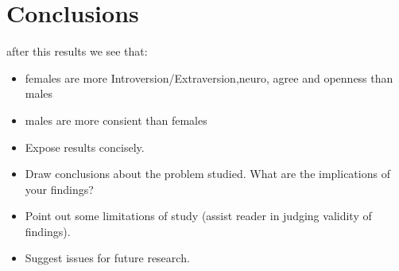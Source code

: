 \section{Conclusions}\label{Sec:Conc}

after this results we see that:


\begin{itemize}

    \item females are more Introversion/Extraversion,neuro, agree and openness than males

    \item males are more consient than females 
   
   \item Expose results concisely.

    \item Draw conclusions about the problem studied. What are the
    implications of your findings?

    \item Point out some limitations of study (assist reader in judging validity
    of findings).

    \item Suggest issues for future research.

\end{itemize}


